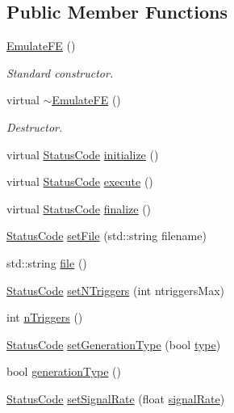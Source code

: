 \subsection*{Public Member Functions}
\begin{DoxyCompactItemize}
\item 
\hyperlink{classEmulateFE_ac6242fca0d5c30477153d1d33d5f990d}{Emulate\+FE} ()
\begin{DoxyCompactList}\small\item\em Standard constructor. \end{DoxyCompactList}\item 
virtual \hyperlink{classEmulateFE_ab0ae9c65e546ec89bb0d6d318428d578}{$\sim$\+Emulate\+FE} ()
\begin{DoxyCompactList}\small\item\em Destructor. \end{DoxyCompactList}\item 
virtual \hyperlink{classStatusCode}{Status\+Code} \hyperlink{classEmulateFE_aeb689a366ed5e675d02d08ee787d338e}{initialize} ()
\item 
virtual \hyperlink{classStatusCode}{Status\+Code} \hyperlink{classEmulateFE_a5133d5b45521fc311db62d61217848b9}{execute} ()
\item 
virtual \hyperlink{classStatusCode}{Status\+Code} \hyperlink{classEmulateFE_a7d29ee79a606d0f7d337b1e78ef54a03}{finalize} ()
\item 
\hyperlink{classStatusCode}{Status\+Code} \hyperlink{classEmulateFE_a33403f61dc51ffc30c008cf5782636b1}{set\+File} (std\+::string filename)
\item 
std\+::string \hyperlink{classEmulateFE_a321a82d6ead6f6089693d3165d7893ec}{file} ()
\item 
\hyperlink{classStatusCode}{Status\+Code} \hyperlink{classEmulateFE_a3a8b53c47db627e5a70076968d5aab53}{set\+N\+Triggers} (int ntriggers\+Max)
\item 
int \hyperlink{classEmulateFE_ab08924ef9529a766ce80c9c1c9885cca}{n\+Triggers} ()
\item 
\hyperlink{classStatusCode}{Status\+Code} \hyperlink{classEmulateFE_ac4592687749d8a457430911ddf8f5e76}{set\+Generation\+Type} (bool \hyperlink{classObject_a84f99f70f144a83e1582d1d0f84e4e62}{type})
\item 
bool \hyperlink{classEmulateFE_ad3aaa46fce2848cc9280e51a7e6fa572}{generation\+Type} ()
\item 
\hyperlink{classStatusCode}{Status\+Code} \hyperlink{classEmulateFE_ad785934c216c213e504f3db72b53354f}{set\+Signal\+Rate} (float \hyperlink{classEmulateFE_a98d2e402e4707109ca14ee9f4d95c2fa}{signal\+Rate})

\end{DoxyCompactItemize}
